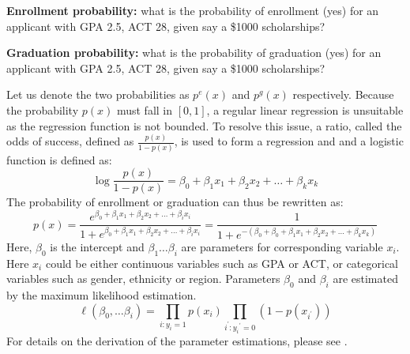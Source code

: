 \documentclass[12pt,english]{report}
\begin{document}
\noindent \textbf{Enrollment probability:} what is the probability of enrollment (yes) for an applicant with GPA 2.5, ACT 28, given say a \$1000 scholarships?

\noindent \textbf{Graduation probability:} what is the probability of graduation (yes) for an applicant with GPA 2.5, ACT 28, given say a \$1000 scholarships?

\vspace{0.15in}
Let us denote the two probabilities as $p^e(x)$ and $p^g(x)$ respectively. Because the probability $p(x)$ must fall in $[0,1]$, a regular linear regression is unsuitable as the regression function is not bounded. To resolve this issue, a ratio, called the odds of success, defined as  $\frac{p(x)}{1-p(x)}$,  is used to form a regression and and a logistic function is defined as:
\begin{equation}
\ensuremath{\log\frac{p(x)}{1-p(x)}=\beta_0+\beta_1 x_1+\beta_2 x_2 +\ldots+\beta_k x_k}
\end{equation}
The probability of enrollment or graduation can thus be rewritten as:
\begin{equation}
p(x)=\frac{e^{\beta_0+\beta_1 x_1+\beta_2 x_2 +\ldots+\beta_i x_i}}{1+e^{\beta_0+\beta_1 x_1+\beta_2 x_2 +\ldots+\beta_ix_i}}
=\frac{1}{1+e^{-(\beta_0+\beta_0+\beta_1 x_1+\beta_2 x_2 +\ldots+\beta_k x_k)}}
\end{equation}
Here, $\beta_0$ is the intercept and $\beta_1 \ldots \beta_i$ are parameters for corresponding variable $x_i$.  Here $x_i$ could be either continuous
variables such as GPA or  ACT, or categorical variables such as gender, ethnicity or region.  Parameters $\beta_0$ and $\beta_i$ are estimated by the maximum likelihood estimation.
\begin{equation}
\ell(\beta_0,\ldots \beta_i) = \prod_{i:y_i=1} p(x_i)
\prod_{i^{'}:y_i{^{'}=0}} (1-p(x_{i^{'}}))
\end{equation}
For details on the derivation of the parameter estimations, please see \citet{Hosmer2013}.
\end{document}
